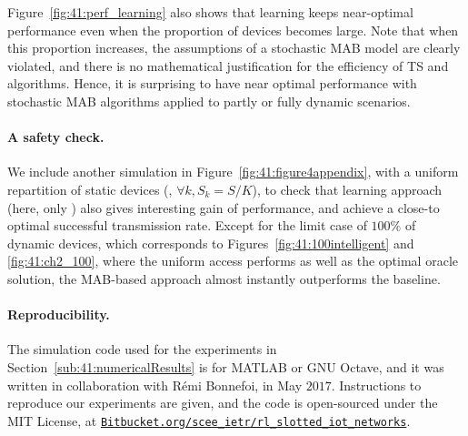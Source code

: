 Figure~\ref{fig:41:perf_learning} also shows that learning keeps near-optimal performance even when the proportion of devices becomes large.
Note that when this proportion increases, the assumptions of a stochastic MAB model are clearly violated, and there is no mathematical justification for the efficiency of TS and \UCB{} algorithms.
Hence, it is surprising to have near optimal performance with stochastic MAB algorithms applied to partly or fully dynamic scenarios.


\paragraph{A safety check.}
%
We include another simulation in Figure~\ref{fig:41:figure4appendix}, with a uniform repartition of static devices (\ie, $\forall k, S_k = S/K$), to check that learning approach (here, only \UCB)
also gives interesting gain of performance, and achieve a close-to optimal successful transmission rate.
Except for the limit case of $100\%$ of dynamic devices, which corresponds to Figures~\ref{fig:41:100intelligent} and \ref{fig:41:ch2_100}, where the uniform access performs as well as the optimal oracle solution, the MAB-based approach almost instantly outperforms the baseline.



\paragraph{Reproducibility.}
%
The simulation code used for the experiments in Section~\ref{sub:41:numericalResults} is for MATLAB or GNU Octave,
and it was written in collaboration with Rémi Bonnefoi, in May $2017$.
Instructions to reproduce our experiments are given, and
the code is open-sourced under the MIT License, at
\href{https://Bitbucket.org/scee_ietr/rl_slotted_iot_networks}{\texttt{Bitbucket.org/scee\_ietr/rl\_slotted\_iot\_networks}}.
